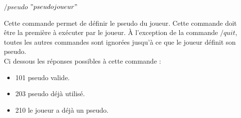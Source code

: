 \par
$/pseudo$ $"pseudojoueur"$
\par
Cette commande permet de définir le pseudo du joueur. Cette commande doit être la première à exécuter par le joueur. À l'exception de la commande $/quit$, toutes les autres commandes sont ignorées jusqu'à ce que le joueur définit son pseudo.\\

Ci dessous les réponses possibles à cette commande : 
\begin{itemize}
	\item 101 pseudo valide.
	
	\item 203 pseudo déjà utilisé.

	\item 210 le joueur a déjà un pseudo.\\
\end{itemize}
